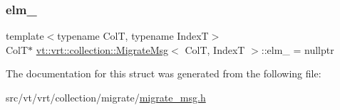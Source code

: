 \subsubsection{\texorpdfstring{elm\+\_\+}{elm\_}}
{\footnotesize\ttfamily template$<$typename ColT, typename IndexT$>$ \\
ColT$\ast$ \hyperlink{structvt_1_1vrt_1_1collection_1_1_migrate_msg}{vt\+::vrt\+::collection\+::\+Migrate\+Msg}$<$ ColT, IndexT $>$\+::elm\+\_\+ = nullptr}



The documentation for this struct was generated from the following file\+:\begin{DoxyCompactItemize}
\item 
src/vt/vrt/collection/migrate/\hyperlink{migrate__msg_8h}{migrate\+\_\+msg.\+h}\end{DoxyCompactItemize}
